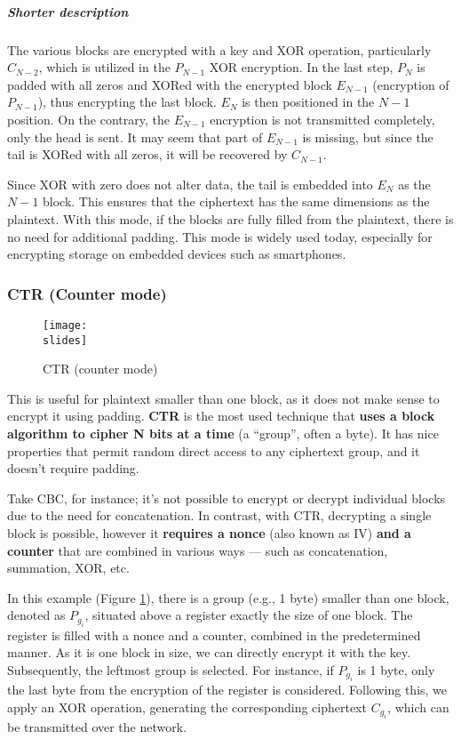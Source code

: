 \subparagraph*{Shorter description}
The various blocks are encrypted with a key and XOR operation, particularly \(C_{N-2}\), which is utilized in the \(P_{N-1}\) XOR encryption.
In the last step, \(P_N\) is padded with all zeros and XORed with the encrypted block \(E_{N-1}\) (encryption of \( P_{N-1} \)), thus encrypting the last block.
\(E_N\) is then positioned in the \(N-1\) position. On the contrary, the \(E_{N-1}\) encryption is not transmitted completely, only the head is sent. It may seem that part of \(E_{N-1}\) is missing, but since the tail is XORed with all zeros, it will be recovered by \(C_{N-1}\).

Since XOR with zero does not alter data, the tail is embedded into \(E_N\) as the \(N-1\) block. This ensures that the ciphertext has the same dimensions as the plaintext. With this mode, if the blocks are fully filled from the plaintext, there is no need for additional padding. This mode is widely used today, especially for encrypting storage on embedded devices such as smartphones.


\subsubsection{CTR (Counter mode)}
\begin{figure}[h]
    \centering
    \texttt{[image: \\slides]}
    \caption{CTR (counter mode)}
    \label{fig:CTR}
\end{figure}
This is useful for plaintext smaller than one block, as it does not make sense to encrypt it using padding. \textbf{CTR} is the most used technique that \textbf{uses a block algorithm to cipher N bits at a time} (a “group”, often a byte). It has nice properties that permit random direct access to any ciphertext group, and it doesn't require padding.

Take CBC, for instance; it's not possible to encrypt or decrypt individual blocks due to the need for concatenation. In contrast, with CTR, decrypting a single block is possible, however it \textbf{requires a nonce} (also known as IV) \textbf{and a counter} that are combined in various ways — such as concatenation, summation, XOR, etc.

In this example (Figure \ref{fig:CTR}), there is a group (e.g., 1 byte) smaller than one block, denoted as $P_{g_i}$, situated above a register exactly the size of one block.
The register is filled with a nonce and a counter, combined in the predetermined manner.
As it is one block in size, we can directly encrypt it with the key. Subsequently, the leftmost group is selected. For instance, if
$P_{g_i}$ is 1 byte, only the last byte from the encryption of the register is considered.
Following this, we apply an XOR operation, generating the corresponding ciphertext $C_{g_i}$, which can be transmitted over the network.


